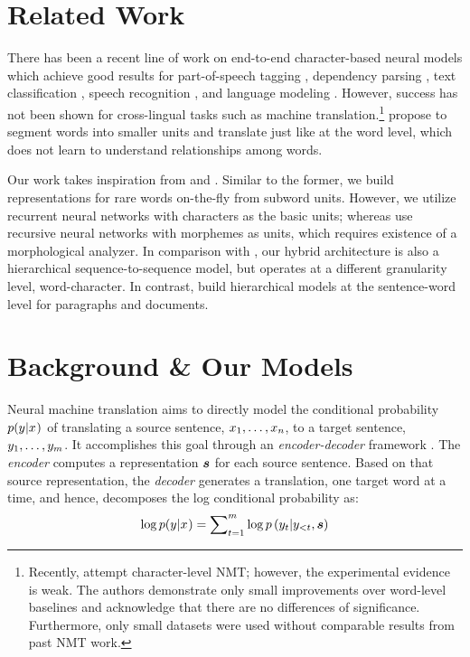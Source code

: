 \section{Related Work}
There has been a recent line of work on end-to-end character-based neural models
which achieve good results for part-of-speech tagging \cite{santos14,ling15function},
dependency parsing \cite{ballesteros15}, text classification
\cite{zhang15}, speech recognition \cite{chan16,bahdanau16}, and language
modeling \cite{kim16,rafal16}. However, success has not been shown for
cross-lingual tasks such as machine translation.\footnote{Recently,
 attempt character-level NMT; however,
the experimental evidence is weak. The authors demonstrate only small
improvements over word-level baselines and acknowledge that there are no differences of
significance. Furthermore, only small datasets were used without
comparable results from past NMT work.}
 propose to segment words into smaller units and
translate just like at the word level, which does not learn to understand
relationships among words.

Our work takes inspiration from \cite{luong13} and 
\cite{li15}. Similar to the former, we build representations for rare words
on-the-fly from subword units. However, we utilize recurrent neural networks
with characters as the basic units; whereas  use recursive neural
networks with morphemes as units, which requires existence of a
morphological analyzer. In comparison with \cite{li15}, our hybrid architecture
is also a hierarchical sequence-to-sequence model, but operates at a different
granularity level, word-character. In contrast,  build
hierarchical models at the sentence-word level for paragraphs and documents.

\section{Background \& Our Models}
\label{sec:nmt}
Neural machine translation aims to directly model the conditional probability $p(y_{}|x_{})$ of translating
a source sentence, $x_{1},\ldots,x_{n}$, to a target sentence, $y_{1},\ldots,y_{m}$.
It accomplishes this goal through an {\it encoder-decoder} framework
\cite{kal13,sutskever14,cho14}. The {\it encoder} computes a representation $\mbox{\boldmath{$s$}}$
for each source sentence. Based on that source representation,
the {\it decoder} generates a translation, one target word at a time, and hence,
decomposes the log conditional probability as:
\begin{equation}
\log p(y_{}|x_{}) = \sum_{t=1}^m \nolimits \log
p\left(y_{t}|y_{<t},\mbox{\boldmath{$s$}}\right)
\label{e:s2s}
\end{equation}


